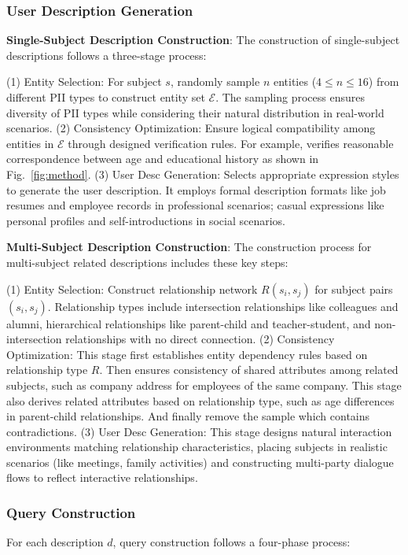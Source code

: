 \subsubsection{User Description Generation}
\textbf{Single-Subject Description Construction}:
The construction of single-subject descriptions follows a three-stage process:

(1) Entity Selection: 
For subject $s$, randomly sample $n$ entities ($4 \leq n \leq 16$) from different PII types to construct entity set $\mathcal{E}$.
The sampling process ensures diversity of PII types while considering their natural distribution in real-world scenarios.
(2) Consistency Optimization: 
Ensure logical compatibility among entities in $\mathcal{E}$ through designed verification rules. 
For example, verifies reasonable correspondence between age and  educational history as shown in Fig.~\ref{fig:method}.
(3) User Desc Generation: 
Selects appropriate expression styles to generate the user description.
It employs formal description formats like job resumes and employee records in professional scenarios; casual expressions like personal profiles and self-introductions in social scenarios.

\textbf{Multi-Subject Description Construction}:
The construction process for multi-subject related descriptions includes these key steps:

(1) Entity Selection: Construct relationship network $R(s_i, s_j)$ for subject pairs $(s_i, s_j)$. Relationship types include intersection relationships like colleagues and alumni, hierarchical relationships like parent-child and teacher-student, and non-intersection relationships with no direct connection.
(2) Consistency Optimization: 
This stage first establishes entity dependency rules based on relationship type $R$.
Then ensures consistency of shared attributes among related subjects, such as company address for employees of the same company.
This stage also derives related attributes based on relationship type, such as age differences in parent-child relationships.
And finally remove the sample which contains contradictions.
(3) User Desc Generation: 
This stage designs natural interaction environments matching relationship characteristics, placing subjects in realistic scenarios (like meetings, family activities) and constructing multi-party dialogue flows to reflect interactive relationships.



\subsubsection{Query Construction}
For each description $d$, query construction follows a four-phase process:

